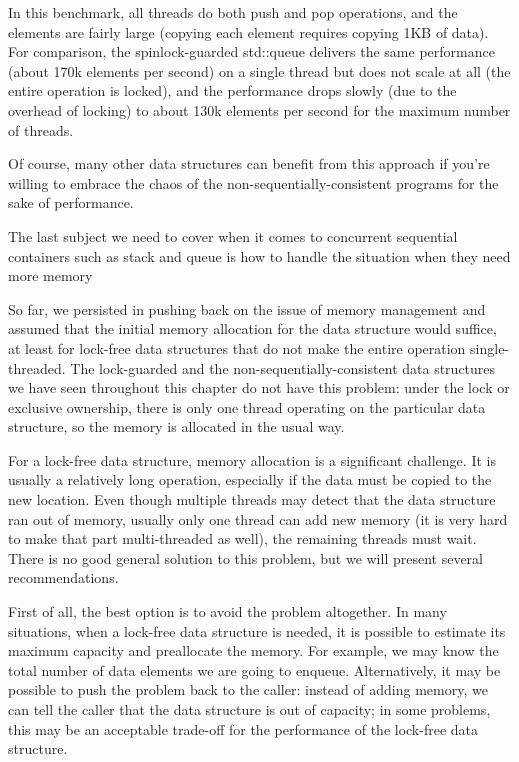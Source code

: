 In this benchmark, all threads do both push and pop operations, and the elements are fairly large (copying each element requires copying 1KB of data). For comparison, the spinlock-guarded std::queue delivers the same performance (about 170k elements per second) on a single thread but does not scale at all (the entire operation is locked), and the performance drops slowly (due to the overhead of locking) to about 130k elements per second for the maximum number of threads.

Of course, many other data structures can benefit from this approach if you're willing to embrace the chaos of the non-sequentially-consistent programs for the sake of 
performance. 

The last subject we need to cover when it comes to concurrent sequential containers such as stack and queue is how to handle the situation when they need more memory


So far, we persisted in pushing back on the issue of memory management and assumed that the initial memory allocation for the data structure would suffice, at least for lock-free data structures that do not make the entire operation single-threaded. The lock-guarded and the non-sequentially-consistent data structures we have seen throughout this chapter do not have this problem: under the lock or exclusive ownership, there is only one thread operating on the particular data structure, so the memory is allocated in the usual way.

For a lock-free data structure, memory allocation is a significant challenge. It is usually a relatively long operation, especially if the data must be copied to the new location. Even though multiple threads may detect that the data structure ran out of memory, usually only one thread can add new memory (it is very hard to make that part multi-threaded as well), the remaining threads must wait. There is no good general solution to this problem, but we will present several recommendations.

First of all, the best option is to avoid the problem altogether. In many situations, when a lock-free data structure is needed, it is possible to estimate its maximum capacity and preallocate the memory. For example, we may know the total number of data elements we are going to enqueue. Alternatively, it may be possible to push the problem back to the caller: instead of adding memory, we can tell the caller that the data structure is out of capacity; in some problems, this may be an acceptable trade-off for the performance of the lock-free data structure.

